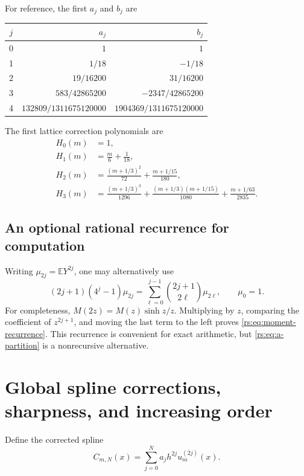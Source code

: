 \documentclass[11pt,a4paper,oneside,openany]{book}
\numberwithin{equation}{chapter}
\theoremstyle{definition}
\theoremstyle{remark}
\newcommand{\E}{\mathbb E}
\begin{document}
For reference, the first $a_j$ and $b_j$ are
\begin{center}
\renewcommand{\arraystretch}{1.45}
\begin{tabular}{c@{\qquad}r@{\qquad}r}
\toprule
$j$ & $a_j$ & $b_j$\\
\midrule
0 & $1$ & $1$\\
1 & $1/18$ & $-1/18$\\
2 & $19/16200$ & $31/16200$\\
3 & $583/42865200$ & $-2347/42865200$\\
4 & $132809/1311675120000$ & $1904369/1311675120000$\\
\bottomrule
\end{tabular}
\end{center}
The first lattice correction polynomials are
\begin{align}
 H_0(m)&=1,\nonumber\\
 H_1(m)&=\frac m6+\frac1{18},\label{rs:eq:H-first}\\
 H_2(m)&=\frac{(m+1/3)^2}{72}+\frac{m+1/15}{180},\nonumber\\
 H_3(m)&=\frac{(m+1/3)^3}{1296}
      +\frac{(m+1/3)(m+1/15)}{1080}
      +\frac{m+1/63}{2835}.\nonumber
\end{align}

\section{An optional rational recurrence for computation}

Writing $\mu_{2j}=\E Y^{2j}$, one may alternatively use
\begin{equation}
 (2j+1)(4^j-1)\mu_{2j}
 =\sum_{\ell=0}^{j-1}\binom{2j+1}{2\ell}\mu_{2\ell},
 \qquad \mu_0=1.
 \label{rs:eq:moment-recurrence}
\end{equation}
For completeness, $M(2z)=M(z)\sinh z/z$. Multiplying by $z$,
comparing the coefficient of $z^{2j+1}$, and moving the last term
to the left proves \eqref{rs:eq:moment-recurrence}. This recurrence is
convenient for exact arithmetic, but \eqref{rs:eq:a-partition} is a
nonrecursive alternative.
\chapter{Global spline corrections, sharpness, and increasing order}\label{rs:sec:global}

Define the corrected spline
\begin{equation}
 C_{m,N}(x)=\sum_{j=0}^N a_jh^{2j}u_m^{(2j)}(x).
 \label{rs:eq:corrected-spline}
\end{equation}
\end{document}
